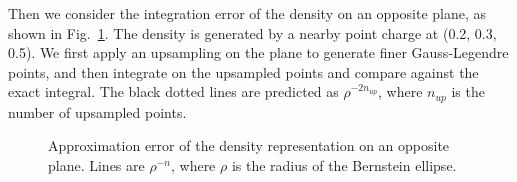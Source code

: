 \documentclass[prb,preprintnumbers,amsmath,amssymb, 10pt]{revtex4}
\begin{document}
Then we consider the integration error of the density on an opposite plane, as shown in Fig.~\ref{fig:3d-near-field-error-density}.
The density is generated by a nearby point charge at (0.2, 0.3, 0.5).
We first apply an upsampling on the plane to generate finer Gauss-Legendre points, and then integrate on the upsampled points and compare against the exact integral.
The black dotted lines are predicted as $\rho^{-2 n_{up}}$, where $n_{up}$ is the number of upsampled points.

\begin{figure}[htbp]
    \centering
    
    \caption{Approximation error of the density representation on an opposite plane. Lines are $\rho^{-n}$, where $\rho$ is the radius of the Bernstein ellipse.}
    \label{fig:3d-near-field-error-density}
\end{figure}

\newpage 

% 

\end{document}
